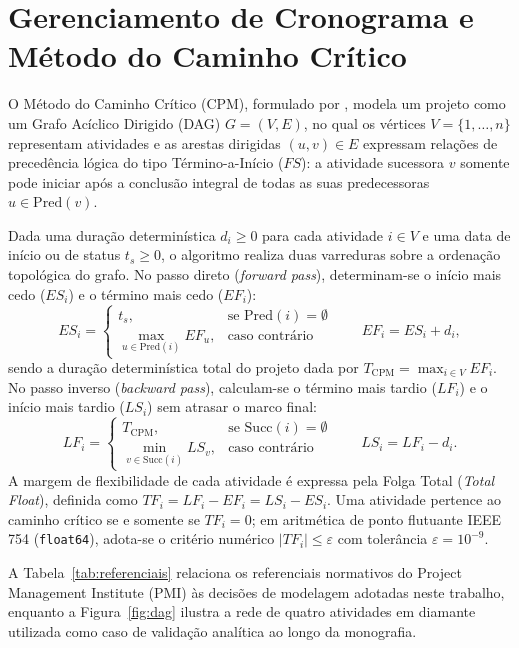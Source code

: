 \documentclass[12pt,openany,oneside,a4paper,english,brazilian,sumario=tradicional]{abntex2}
\begin{document}
\section{Gerenciamento de Cronograma e Método do Caminho Crítico}

O Método do Caminho Crítico (CPM), formulado por , modela um projeto como um Grafo Acíclico Dirigido (DAG) $G=(V,E)$, no qual os vértices $V=\{1,\dots,n\}$ representam atividades e as arestas dirigidas $(u,v)\in E$ expressam relações de precedência lógica do tipo Término-a-Início ($FS$): a atividade sucessora $v$ somente pode iniciar após a conclusão integral de todas as suas predecessoras $u \in \mathrm{Pred}(v)$.

Dada uma duração determinística $d_i \ge 0$ para cada atividade $i \in V$ e uma data de início ou de status $t_s \ge 0$, o algoritmo realiza duas varreduras sobre a ordenação topológica do grafo. No passo direto (\textit{forward pass}), determinam-se o início mais cedo ($ES_i$) e o término mais cedo ($EF_i$):
\begin{equation}
ES_i=\begin{cases}t_s,&\text{se }\mathrm{Pred}(i)=\emptyset\\ \max_{u\in \mathrm{Pred}(i)}EF_u,&\text{caso contrário}\end{cases}\qquad EF_i=ES_i+d_i,
\end{equation}
sendo a duração determinística total do projeto dada por $T_{\mathrm{CPM}}=\max_{i\in V}EF_i$. No passo inverso (\textit{backward pass}), calculam-se o término mais tardio ($LF_i$) e o início mais tardio ($LS_i$) sem atrasar o marco final:
\begin{equation}
LF_i=\begin{cases}T_{\mathrm{CPM}},&\text{se }\mathrm{Succ}(i)=\emptyset\\ \min_{v\in\mathrm{Succ}(i)}LS_v,&\text{caso contrário}\end{cases}\qquad LS_i=LF_i-d_i.
\end{equation}
A margem de flexibilidade de cada atividade é expressa pela Folga Total (\textit{Total Float}), definida como $TF_i=LF_i-EF_i=LS_i-ES_i$. Uma atividade pertence ao caminho crítico se e somente se $TF_i=0$; em aritmética de ponto flutuante IEEE 754 (\texttt{float64}), adota-se o critério numérico $|TF_i| \le \varepsilon$ com tolerância $\varepsilon=10^{-9}$.

A Tabela~\ref{tab:referenciais} relaciona os referenciais normativos do Project Management Institute (PMI) às decisões de modelagem adotadas neste trabalho, enquanto a Figura~\ref{fig:dag} ilustra a rede de quatro atividades em diamante utilizada como caso de validação analítica ao longo da monografia.
\end{document}

